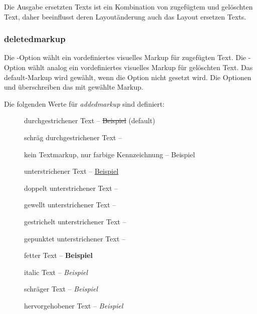 Die Ausgabe ersetzten Texts ist ein Kombination von zugefügtem und gelöschten Text, daher beeinflusst deren Layoutänderung auch das Layout ersetzen Texts.



\subsubsection{deletedmarkup}
\label{sec:ui:options:deletedmarkup}


Die -Option wählt ein vordefiniertes visuelles Markup für zugefügten Text.
Die -Option wählt analog ein vordefiniertes visuelles Markup für gelöschten Text.
Das default-Markup wird gewählt, wenn die Option nicht gesetzt wird.
Die Optionen  und  überschreiben das mit  gewählte Markup.

Die folgenden Werte für \emph{addedmarkup} sind definiert:

\begin{description}
	\item [] durchgestrichener Text -- \sout{Beispiel} (default)
	\item [] schräg durchgestrichener Text -- 
	\item [] kein Textmarkup, nur farbige Kennzeichnung -- {\color{orange} Beispiel}
	\item [] unterstrichener Text -- \uline{Beispiel}
	\item [] doppelt unterstrichener Text -- 
	\item [] gewellt unterstrichener Text -- 
	\item [] gestrichelt unterstrichener Text -- 
	\item [] gepunktet unterstrichener Text -- 
	\item [] fetter Text -- \textbf{Beispiel}
	\item [] italic Text -- \textit{Beispiel}
	\item [] schräger Text -- \textsl{Beispiel}
	\item [] hervorgehobener Text -- \emph{Beispiel}
\end{description}

